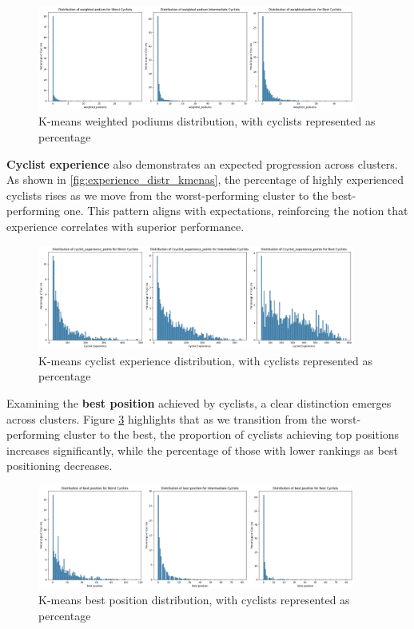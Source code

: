 \begin{figure}[H]  
\centering  
\includegraphics[width=0.93\textwidth]{images/CLUSTER/k-means/podiums_distr.png}  
\caption{ \small K-means weighted podiums distribution, with cyclists represented as percentage}  
\label{fig:podiums_distr_kmenas}  
\end{figure}  

\noindent  
\textbf{Cyclist experience} also demonstrates an expected progression across clusters. As shown in \autoref{fig:experience_distr_kmenas}, the percentage of highly experienced cyclists rises as we move from the worst-performing cluster to the best-performing one. This pattern aligns with expectations, reinforcing the notion that experience correlates with superior performance.  

\begin{figure}[H]  
\centering  
\includegraphics[width=0.93\textwidth]{images/CLUSTER/k-means/experience_distr.png}  
\caption{ \small K-means cyclist experience distribution, with cyclists represented as percentage}  
\label{fig:experience_distr_kmenas}  
\end{figure}  

\noindent  
Examining the \textbf{best position} achieved by cyclists, a clear distinction emerges across clusters. Figure \ref{fig:best_position_distr_kmeans} highlights that as we transition from the worst-performing cluster to the best, the proportion of cyclists achieving top positions increases significantly, while the percentage of those with lower rankings as best positioning decreases.  

\begin{figure}[H]  
\centering  
\includegraphics[width=0.93\textwidth]{images/CLUSTER/k-means/best_position_distr.png}  
\caption{ \small K-means best position distribution, with cyclists represented as percentage}  
\label{fig:best_position_distr_kmeans}  
\end{figure}  

